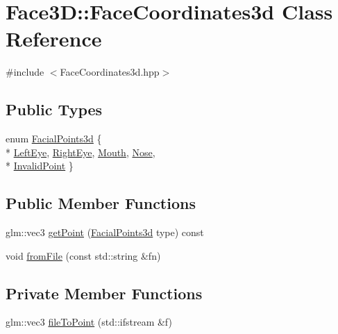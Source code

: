 \hypertarget{class_face3_d_1_1_face_coordinates3d}{}\section{Face3D\+:\+:Face\+Coordinates3d Class Reference}
\label{class_face3_d_1_1_face_coordinates3d}


{\ttfamily \#include $<$Face\+Coordinates3d.\+hpp$>$}

\subsection*{Public Types}
\begin{DoxyCompactItemize}
\item 
enum \hyperlink{class_face3_d_1_1_face_coordinates3d_a8bedd28eb0ab2749aa98a888921ea2b2}{Facial\+Points3d} \{ \\*
\hyperlink{class_face3_d_1_1_face_coordinates3d_a8bedd28eb0ab2749aa98a888921ea2b2ae46fc9712285f861bf9db6cdca3b6f9d}{Left\+Eye}, 
\hyperlink{class_face3_d_1_1_face_coordinates3d_a8bedd28eb0ab2749aa98a888921ea2b2a92625dad6ca65ec8758fe9cf1652997b}{Right\+Eye}, 
\hyperlink{class_face3_d_1_1_face_coordinates3d_a8bedd28eb0ab2749aa98a888921ea2b2a39e45eff70c506fc33d410cc68ccb22b}{Mouth}, 
\hyperlink{class_face3_d_1_1_face_coordinates3d_a8bedd28eb0ab2749aa98a888921ea2b2a36a8ea194a9ac6523814f63beb63ae8a}{Nose}, 
\\*
\hyperlink{class_face3_d_1_1_face_coordinates3d_a8bedd28eb0ab2749aa98a888921ea2b2a7a89277f3a276a2c9c008860d4e73e99}{Invalid\+Point}
 \}
\end{DoxyCompactItemize}
\subsection*{Public Member Functions}
\begin{DoxyCompactItemize}
\item 
glm\+::vec3 \hyperlink{class_face3_d_1_1_face_coordinates3d_aac912dcbb5db9d5ea1d6ca754afa5a39}{get\+Point} (\hyperlink{class_face3_d_1_1_face_coordinates3d_a8bedd28eb0ab2749aa98a888921ea2b2}{Facial\+Points3d} type) const 
\item 
void \hyperlink{class_face3_d_1_1_face_coordinates3d_a1c44e33ec6cd6c54c119d2a2ec4b49e7}{from\+File} (const std\+::string \&fn)
\end{DoxyCompactItemize}
\subsection*{Private Member Functions}
\begin{DoxyCompactItemize}
\item 
glm\+::vec3 \hyperlink{class_face3_d_1_1_face_coordinates3d_adbc5a5615a2a469b98d995157445e4f7}{file\+To\+Point} (std\+::ifstream \&f)
\end{DoxyCompactItemize}
